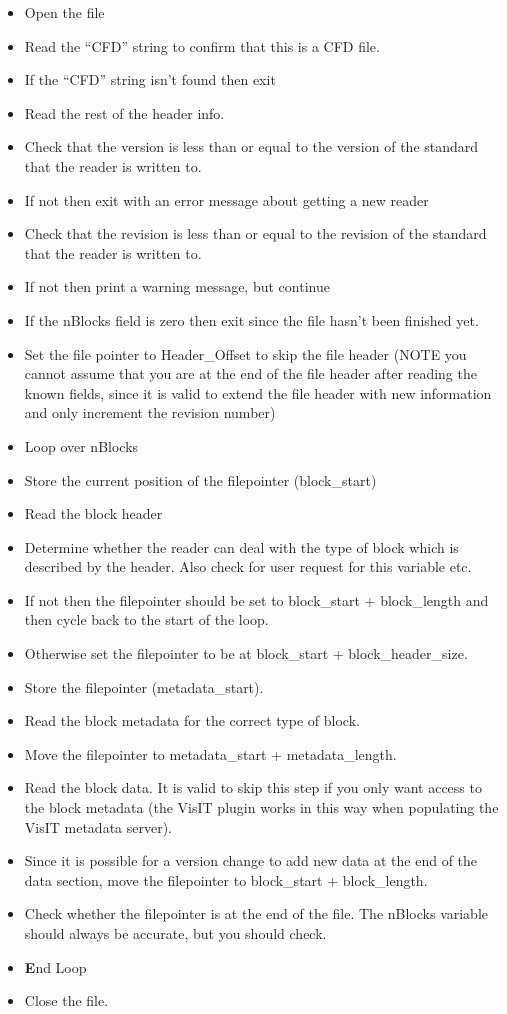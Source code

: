 \documentclass[8pt]{article}
\begin{document}
\begin{itemize}
\item Open the file
\item Read the ``CFD'' string to confirm that this is a CFD file.
\item If the ``CFD'' string isn't found then exit
\item Read the rest of the header info.
\item Check that the version is less than or equal to the version of the standard that the reader is written to.
\item If not then exit with an error message about getting a new reader
\item Check that the revision is less than or equal to the revision of the standard that the reader is written to.
\item If not then print a warning message, but continue
\item If the nBlocks field is zero then exit since the file hasn't been finished yet.
\item Set the file pointer to Header\_Offset to skip the file header (NOTE you cannot assume that you are at the end of the file header after reading the known fields, since it is valid to extend the file header with new information and only increment the revision number)
\item Loop over nBlocks
\item Store the current position of the filepointer (block\_start)
\item Read the block header
\item Determine whether the reader can deal with the type of block which is described by the header. Also check for user request for this variable etc.
\item If not then the filepointer should be set to block\_start + block\_length and then cycle back to the start of the loop.
\item Otherwise set the filepointer to be at block\_start + block\_header\_size.
\item Store the filepointer (metadata\_start).
\item Read the block metadata for the correct type of block.
\item Move the filepointer to metadata\_start + metadata\_length.
\item Read the block data. It is valid to skip this step if you only want access to the block metadata (the VisIT plugin works in this way when populating the VisIT metadata server).
\item Since it is possible for a version change to add new data at the end of the data section, move the filepointer to block\_start + block\_length.
\item Check whether the filepointer is at the end of the file. The nBlocks variable should always be accurate, but you should check.
\item {\textbf End Loop}
\item Close the file.
\end{itemize}
\end{document}
